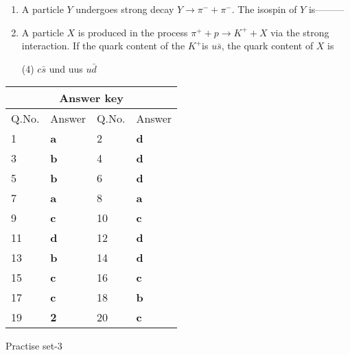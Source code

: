 \begin{enumerate}
	\item  A particle $Y$ undergoes strong decay $Y \rightarrow \pi^{-}+\pi^{-}$. The isospin of $Y$ is---------
	{}

	\item  A particle $X$ is produced in the process $\pi^{+}+p \rightarrow K^{+}+X$ via the strong interaction. If the quark content of the $K^{+}$is $u \bar{s}$, the quark content of $X$ is
{}
	 \begin{tasks}(4)
		\task[\textbf{a.}]$c \bar{s}$
		\task[\textbf{b.}]und
		\task[\textbf{c.}]uus
		\task[\textbf{d.}]$u \bar{d}$ 
	\end{tasks}

\end{enumerate}
\setlength\arrayrulewidth{1pt}
\begin{table}[H]
	\centering
	\begin{tabular}{|p{1.5cm}|p{1.5cm}||p{1.5cm}|p{1.5cm}|}
		\hline
		\multicolumn{4}{|c|}{\textbf{Answer key}}\\\hline\hline
		\rowcolor{ocrel}Q.No.&Answer&Q.No.&Answer\\\hline
		1&\textbf{a} &2&\textbf{d}\\\hline 
		3&\textbf{b} &4&\textbf{d} \\\hline
		5&\textbf{b} &6&\textbf{d} \\\hline
		7&\textbf{a}&8&\textbf{a}\\\hline
		9&\textbf{c}&10&\textbf{c}\\\hline
		11&\textbf{d} &12&\textbf{d}\\\hline
		13&\textbf{b}&14&\textbf{d}\\\hline
		15&\textbf{c}&16&\textbf{c} \\\hline
		17&\textbf{c}&18&\textbf{b}\\\hline
		19&\textbf{2}&20&\textbf{c}\\\hline
	\end{tabular}
\end{table}
\begin{abox}
	Practise set-3
\end{abox}
